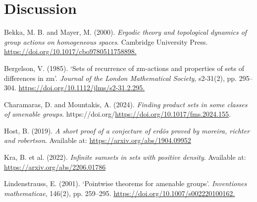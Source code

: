 \documentclass[
  british,
]{article}
\newlength{\cslhangindent}
\newenvironment{CSLReferences}[2] %
 {\begin{list}{}{%
  \setlength{\itemindent}{0pt}
  \setlength{\leftmargin}{0pt}
  \setlength{\parsep}{0pt}
  \ifodd #1
   \setlength{\leftmargin}{\cslhangindent}
   \setlength{\itemindent}{-1\cslhangindent}
  \fi
  \setlength{\itemsep}{#2\baselineskip}}}
 {\end{list}}
\theoremstyle{definition}
\theoremstyle{plain}
\theoremstyle{plain}
\theoremstyle{plain}
\theoremstyle{remark}
\begin{document}
\section{Discussion}\label{discussion}

\protect{}\label{refs}
\begin{CSLReferences}{1}{0}
Bekka, M. B. and Mayer, M. (2000). \emph{Ergodic theory and topological
dynamics of group actions on homogeneous spaces}. Cambridge University
Press.
\href{https://doi.org/10.1017/cbo9780511758898}{https://doi.org/10.1017/cbo9780511758898.}

Bergelson, V. (1985). `Sets of recurrence of zm-actions and properties
of sets of differences in zm'. \emph{Journal of the London Mathematical
Society}, s2-31(2), pp. 295--304.
\href{https://doi.org/10.1112/jlms/s2-31.2.295}{https://doi.org/10.1112/jlms/s2-31.2.295.}

Charamaras, D. and Mountakis, A. (2024). \emph{Finding product sets in
some classes of amenable groups}.
https://doi.org/\url{https://doi.org/10.1017/fms.2024.155}.

Host, B. (2019). \emph{A short proof of a conjecture of erdös proved by
moreira, richter and robertson}. Available at:
\url{https://arxiv.org/abs/1904.09952}

Kra, B. et al. (2022). \emph{Infinite sumsets in sets with positive
density}. Available at: \url{https://arxiv.org/abs/2206.01786}

Lindenstrauss, E. (2001). `Pointwise theorems for amenable groups'.
\emph{Inventiones mathematicae}, 146(2), pp. 259--295.
\href{https://doi.org/10.1007/s002220100162}{https://doi.org/10.1007/s002220100162.}

\end{CSLReferences}
\end{document}

